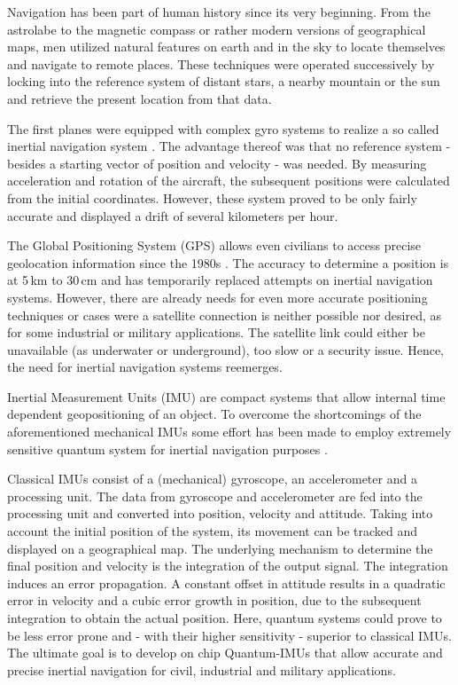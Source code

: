%
%
Navigation has been part of human history since its very beginning. From the astrolabe to the magnetic compass or rather modern versions of geographical maps, men utilized natural features on earth and in the sky to locate themselves and navigate to remote places. These techniques were operated successively by locking into the reference system of distant stars, a nearby mountain or the sun and retrieve the present location from that data.

The first planes were equipped with complex gyro systems to realize a so called inertial navigation system \cite{Siciliano2008}. The advantage thereof was that no reference system - besides a starting vector of position and velocity - was needed. By measuring acceleration and rotation of the aircraft, the subsequent positions were calculated from the initial coordinates. However, these system proved to be only fairly accurate and displayed a drift of several kilometers per hour.

The Global Positioning System (GPS) allows even civilians to access precise geolocation information since the 1980s \cite{Beutler2009}. The accuracy to determine a position is at 5\,km to 30\,cm and has temporarily replaced attempts on inertial navigation systems. However, there are already needs for even more accurate positioning techniques or cases were a satellite connection is neither possible nor desired, as for some industrial or military applications. The satellite link could either be unavailable (as underwater or underground), too slow or a security issue. Hence, the need for inertial navigation systems reemerges.

Inertial Measurement Units (IMU) are compact systems that allow internal time dependent geopositioning of an object. To overcome the shortcomings of the aforementioned mechanical IMUs some effort has been made to employ extremely sensitive quantum system for inertial navigation purposes \cite{Geiger2020arxiv,Geiger2011}.

Classical IMUs consist of a (mechanical) gyroscope, an accelerometer and a processing unit. The data from gyroscope and accelerometer are fed into the processing unit and converted into position, velocity and attitude. Taking into account the initial position of the system, its movement can be tracked and displayed on a geographical map. The underlying mechanism to determine the final position and velocity is the integration of the output signal. The integration induces an error propagation. A constant offset in attitude results in a quadratic error in velocity and a cubic error growth in position, due to the subsequent integration to obtain the actual position. Here, quantum systems could prove to be less error prone and - with their higher sensitivity - superior to classical IMUs. The ultimate goal is to develop on chip Quantum-IMUs that allow accurate and precise inertial navigation for civil, industrial and military applications.

